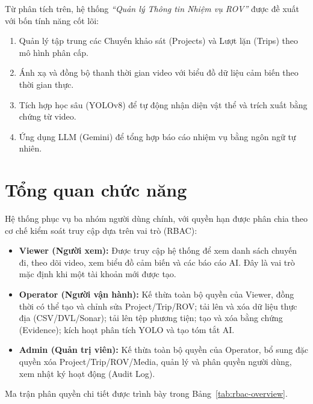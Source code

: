 \documentclass[../DoAn.tex]{subfiles}
\begin{document}
Từ phân tích trên, hệ thống \textit{``Quản lý Thông tin Nhiệm vụ ROV''} được đề xuất với bốn tính năng cốt lõi:
\begin{enumerate}[leftmargin=*, topsep=4pt, itemsep=2pt]
  \item Quản lý tập trung các Chuyến khảo sát (Projects) và Lượt lặn (Trips) theo mô hình phân cấp.
  \item Ánh xạ và đồng bộ thanh thời gian video với biểu đồ dữ liệu cảm biến theo thời gian thực.
  \item Tích hợp học sâu (YOLOv8) để tự động nhận diện vật thể và trích xuất bằng chứng từ video.
  \item Ứng dụng LLM (Gemini) để tổng hợp báo cáo nhiệm vụ bằng ngôn ngữ tự nhiên.
\end{enumerate}

\section{Tổng quan chức năng}
\label{section:2.2}

Hệ thống phục vụ ba nhóm người dùng chính, với quyền hạn được phân chia theo cơ chế kiểm soát truy cập dựa trên vai trò (RBAC):

\begin{itemize}[leftmargin=*, topsep=4pt, itemsep=2pt]
  \item \textbf{Viewer (Người xem):} Được truy cập hệ thống để xem danh sách chuyến đi, theo dõi video, xem biểu đồ cảm biến và các báo cáo AI. Đây là vai trò mặc định khi một tài khoản mới được tạo.
  \item \textbf{Operator (Người vận hành):} Kế thừa toàn bộ quyền của Viewer, đồng thời có thể tạo và chỉnh sửa Project/Trip/ROV; tải lên và xóa dữ liệu thực địa (CSV/DVL/Sonar); tải lên tệp phương tiện; tạo và xóa bằng chứng (Evidence); kích hoạt phân tích YOLO và tạo tóm tắt AI.
  \item \textbf{Admin (Quản trị viên):} Kế thừa toàn bộ quyền của Operator, bổ sung đặc quyền xóa Project/Trip/ROV/Media, quản lý và phân quyền người dùng, xem nhật ký hoạt động (Audit Log).
\end{itemize}

Ma trận phân quyền chi tiết được trình bày trong Bảng~\ref{tab:rbac-overview}.
\end{document}
